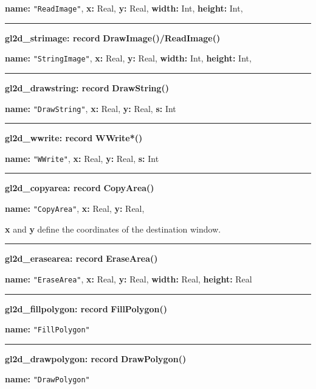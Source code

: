 \documentclass[letterpaper,12pt]{article}
\begin{document}
{\bf name:} \texttt{"ReadImage"},\newline\indent
{\bf x:} Real,
{\bf y:} Real,
{\bf width:} Int,
{\bf height:} Int,

\bigskip\hrule\vspace{0.1cm}
\noindent
{\bf gl2d\_strimage: record} \hfill {\bf DrawImage()/ReadImage()} 

{\bf name:} \texttt{"StringImage"},\newline\indent
{\bf x:} Real,
{\bf y:} Real,
{\bf width:} Int,
{\bf height:} Int,

\bigskip\hrule\vspace{0.1cm}
\noindent
{\bf gl2d\_drawstring: record} \hfill {\bf DrawString()} 

{\bf name:} \texttt{"DrawString"},\newline\indent
{\bf x:} Real,
{\bf y:} Real,
{\bf s:} Int

\bigskip\hrule\vspace{0.1cm}
\noindent
{\bf gl2d\_wwrite: record} \hfill {\bf WWrite*()} 

{\bf name:} \texttt{"WWrite"},\newline\indent
{\bf x:} Real,
{\bf y:} Real,
{\bf s:} Int

\bigskip\hrule\vspace{0.1cm}
\noindent
{\bf gl2d\_copyarea: record} \hfill {\bf CopyArea()} 

{\bf name:} \texttt{"CopyArea"},\newline\indent
{\bf x:} Real,
{\bf y:} Real,

\noindent
{\bf x} and {\bf y} define the coordinates of the destination window.

\newpage\hrule\vspace{0.1cm}
\noindent
{\bf gl2d\_erasearea: record} \hfill {\bf EraseArea()} 

{\bf name:} \texttt{"EraseArea"},\newline\indent
{\bf x:} Real,
{\bf y:} Real,
{\bf width:} Real,
{\bf height:} Real

\bigskip\hrule\vspace{0.1cm}
\noindent
{\bf gl2d\_fillpolygon: record} \hfill {\bf FillPolygon()} 

{\bf name:} \texttt{"FillPolygon"}

\bigskip\hrule\vspace{0.1cm}
\noindent
{\bf gl2d\_drawpolygon: record} \hfill {\bf DrawPolygon()} 

{\bf name:} \texttt{"DrawPolygon"}
\end{document}
